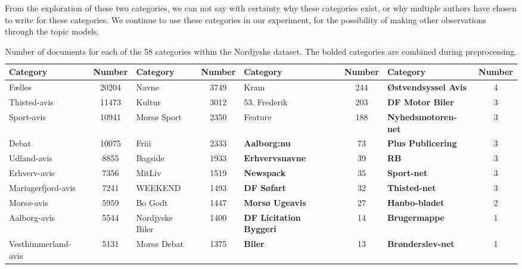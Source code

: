 From the exploration of these two categories, we can not say with certainty why these categories exist, or why multiple authors have chosen to write for these categories.
We continue to use these categories in our experiment, for the possibility of making other observations through the topic models.
\begin{table}[h]
	\caption{Number of documents for each of the 58 categories within the Nordjyske dataset.
		The bolded categories are combined during preprocessing.}
	\label{tab:category_table}
	\centering
	\begin{tabular}{l|c|l|c|l|c|l|c}
		Category            & Number & Category        & Number & Category                       & Number & Category                    & Number \\
		\midrule
		Fælles              & 20204  & Navne           &  3749  & Kram                           &  244   & \textbf{Østvendsyssel Avis} &   4    \\
		Thisted-avis        & 11473  & Kultur          &  3012  & 53. Frederik                   &  203   & \textbf{DF Motor Biler}     &   3    \\
		Sport-avis          & 10941  & Morsø Sport     &  2350  & Feature                        &  188   & \textbf{Nyhedsmotoren-net}  &   3    \\
		Debat               & 10075  & Friii           &  2333  & \textbf{Aalborg:nu}            &   73   & \textbf{Plus Publicering}   &   3    \\
		Udland-avis         &  8855  & Bagside         &  1933  & \textbf{Erhvervsnavne}         &   39   & \textbf{RB}                 &   3    \\
		Erhverv-avis        &  7356  & MitLiv          &  1519  & \textbf{Newspack}              &   35   & \textbf{Sport-net}          &   3    \\
		Mariagerfjord-avis  &  7241  & WEEKEND         &  1493  & \textbf{DF Søfart}             &   32   & \textbf{Thisted-net}        &   3    \\
		Morsø-avis          &  5959  & Bo Godt         &  1447  & \textbf{Morsø Ugeavis}         &   27   & \textbf{Hanbo-bladet}       &   2    \\
		Aalborg-avis        &  5544  & Nordjyske Biler &  1400  & \textbf{DF Licitation Byggeri} &   14   & \textbf{Brugermappe}        &   1    \\
		Vesthimmerland-avis &  5131  & Morsø Debat     &  1375  & \textbf{Biler}                 &   13   & \textbf{Brønderslev-net}    &   1    \\

\end{tabular}
\end{table}
